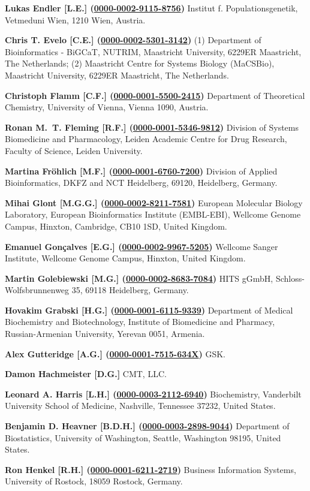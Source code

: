 \documentclass{sbml-paper}
\newcommand{\orcid}[1]{\href{https://orcid.org/#1}{#1}}
\begin{document}
\textbf{Lukas Endler [L.E.] (\orcid{0000-0002-9115-8756})} Institut f. Populationsgenetik, Vetmeduni  Wien, 1210 Wien, Austria.

\textbf{Chris T. Evelo [C.E.] (\orcid{0000-0002-5301-3142})} (1) Department of Bioinformatics - BiGCaT, NUTRIM, Maastricht University, 6229ER Maastricht, The Netherlands; (2) Maastricht Centre for Systems Biology (MaCSBio), Maastricht University, 6229ER Maastricht, The Netherlands.

\textbf{Christoph Flamm [C.F.] (\orcid{0000-0001-5500-2415})} Department of Theoretical Chemistry, University of Vienna, Vienna 1090, Austria.

\textbf{Ronan M.~T. Fleming [R.F.] (\orcid{0000-0001-5346-9812})} Division of Systems Biomedicine and Pharmacology, Leiden Academic Centre for Drug Research, Faculty of Science, Leiden University.

\textbf{Martina Fröhlich [M.F.] (\orcid{0000-0001-6760-7200})} Division of Applied Bioinformatics, DKFZ and NCT Heidelberg, 69120, Heidelberg, Germany.

\textbf{Mihai Glont [M.G.G.] (\orcid{0000-0002-8211-7581})} European Molecular Biology Laboratory, European Bioinformatics Institute (EMBL-EBI), Wellcome Genome Campus, Hinxton, Cambridge, CB10 1SD, United Kingdom.

\textbf{Emanuel Gonçalves [E.G.] (\orcid{0000-0002-9967-5205})} Wellcome Sanger Institute, Wellcome Genome Campus, Hinxton, United Kingdom.

\textbf{Martin Golebiewski [M.G.] (\orcid{0000-0002-8683-7084})} HITS gGmbH, Schloss-Wolfsbrunnenweg 35, 69118 Heidelberg, Germany.

\textbf{Hovakim Grabski [H.G.] (\orcid{0000-0001-6115-9339})} Department of Medical Biochemistry and Biotechnology, Institute of Biomedicine and Pharmacy, Russian-Armenian University, Yerevan 0051, Armenia.

\textbf{Alex Gutteridge [A.G.] (\orcid{0000-0001-7515-634X})} GSK.

\textbf{Damon Hachmeister [D.G.]} CMT, LLC.

\textbf{Leonard A. Harris [L.H.] (\orcid{0000-0003-2112-6940})} Biochemistry, Vanderbilt University School of Medicine, Nashville, Tennessee 37232, United States.

\textbf{Benjamin D. Heavner [B.D.H.] (\orcid{0000-0003-2898-9044})} Department of Biostatistics, University of Washington, Seattle, Washington 98195, United States.

\textbf{Ron Henkel [R.H.] (\orcid{0000-0001-6211-2719})} Business Information Systems, University of Rostock, 18059 Rostock, Germany.
\end{document}
